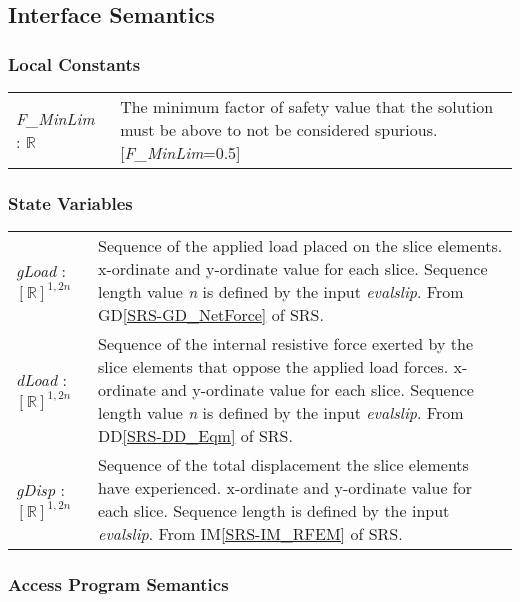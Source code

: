 \documentclass[12pt, titlepage]{article}
\begin{document}
\subsection{Interface Semantics}

\subsubsection{Local Constants}

\renewcommand*{\arraystretch}{1.5}
\begin{longtable}{p{} p{}}
  \textit{F\_MinLim} : $\mathbb{R}$ &  The minimum factor of safety
  value that the solution must be above to not be considered
  spurious. [\textit{F\_MinLim}=0.5]\\
\end{longtable}

\subsubsection{State Variables}

\renewcommand*{\arraystretch}{1.5}
\begin{longtable}{p{} p{}}
  \textit{gLoad} : $[\mathbb{R}]^{1,2n}$ & Sequence of the applied
  load placed on the slice elements. x-ordinate and y-ordinate value
  for each slice. Sequence length value \textit{n} is defined by the
  input \textit{evalslip}. From GD\ref{SRS-GD_NetForce} of SRS.\\

  \textit{dLoad} : $[\mathbb{R}]^{1,2n}$ & Sequence of the internal
  resistive force exerted by the slice elements that oppose the
  applied load forces. x-ordinate and y-ordinate value for each
  slice. Sequence length value \textit{n} is defined by the input
  \textit{evalslip}. From DD\ref{SRS-DD_Eqm} of SRS.\\

  \textit{gDisp} : $[\mathbb{R}]^{1,2n}$ & Sequence of the total
  displacement the slice elements have experienced. x-ordinate and
  y-ordinate value for each slice. Sequence length is defined by the
  input \textit{evalslip}. From IM\ref{SRS-IM_RFEM} of SRS.\\
\end{longtable}

\subsubsection{Access Program Semantics}
\end{document}
